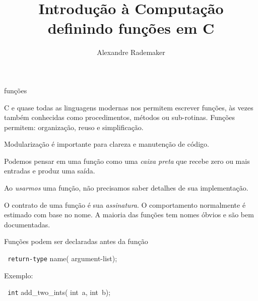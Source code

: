 \documentclass{beamer}
\title{Introdução à Computação \\ definindo funções em C}
\author{Alexandre Rademaker}
\date{}
\begin{document}
\begin{frame}
 \maketitle
\end{frame}


\begin{frame}{funções}

  C e quase todas as linguagens modernas nos permitem escrever
  funções, às vezes também conhecidas como procedimentos, métodos ou
  sub-rotinas. Funções permitem: organização, reuso e simplificação.

  Modularização é importante para clareza e manutenção de código.

  Podemos pensar em uma função como uma \emph{caixa preta} que recebe
  zero ou mais entradas e produz uma saída.

  Ao \emph{usarmos} uma função, não precisamos saber detalhes de sua
  implementação.

  \framebreak

  O contrato de uma função é sua \emph{assinatura}. O comportamento
  normalmente é estimado com base no nome. A maioria das funções tem
  nomes óbvios e são bem documentadas.

  \begin{center}
  \end{center}

  \framebreak

  Funções podem ser declaradas antes da função 

  {\texttt
    {\color{teal} return-type} {\color{red} name}({\color{blue} argument-list});}

  Exemplo:

  {\texttt
    {\color{teal} int} {\color{red} add\_two\_ints}({\color{blue} int\ a, int\ b});}


\end{frame}
\end{document}
